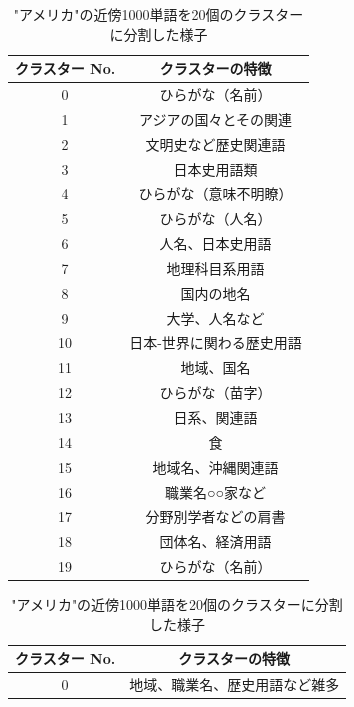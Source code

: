 \begin{table}[h]
  \begin{minipage}[t]{.45\textwidth}
    \caption["日本"の近傍1000単語を20個のクラスターに分割した様子]{"日本"の近傍1000単語を20個のクラスターに分割した様子}
    \label{}
    \begin{center}
      \begin{tabular}{|c||c|} \hline
        クラスター No. & クラスターの特徴 \\ \hline \hline
        0 & ひらがな（名前） \\
        1 & アジアの国々とその関連  \\
        2 & 文明史など歴史関連語  \\
        3 & 日本史用語類  \\
        4 & ひらがな（意味不明瞭）  \\
        5 & ひらがな（人名） \\
        6 & 人名、日本史用語 \\
        7 & 地理科目系用語 \\
        8 & 国内の地名 \\
        9 & 大学、人名など \\
        10 & 日本-世界に関わる歴史用語 \\ \hline
        11 & 地域、国名 \\
        12 & ひらがな（苗字） \\
        13 & 日系、関連語 \\
        14 & 食 \\
        15 & 地域名、沖縄関連語 \\
        16 & 職業名○○家など \\
        17 & 分野別学者などの肩書 \\
        18 & 団体名、経済用語 \\
        19 & ひらがな（名前） \\ \hline
      \end{tabular}
    \end{center}
  \end{minipage}
  \hfill
  \begin{minipage}[t]{.45\textwidth}
    \caption["アメリカ"の近傍1000単語を20個のクラスターに分割した様子]{"アメリカ"の近傍1000単語を20個のクラスターに分割した様子}
    \label{}
    \begin{center}
      \begin{tabular}{|c||c|} \hline
        クラスター No. & クラスターの特徴 \\ \hline \hline
        0 & 地域、職業名、歴史用語など雑多 \\

\end{tabular}
\end{center}
\end{minipage}
\end{table}
